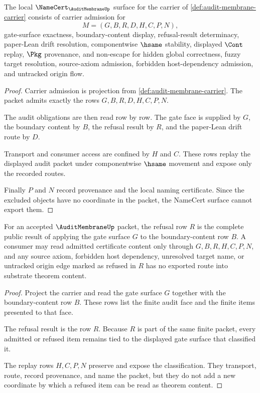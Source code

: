 \begin{theorem}
\label{thm:audit-membrane-namecert-obligations}
The local $\NameCert_{\AuditMembraneUp}$ surface for the carrier of \autoref{def:audit-membrane-carrier} consists of carrier admission for
$$
M=(G,B,R,D,H,C,P,N),
$$
gate-surface exactness, boundary-content display, refusal-result determinacy, paper-Lean drift resolution, componentwise $\hsame$ stability, displayed $\Cont$ replay, $\Pkg$ provenance, and non-escape for hidden global correctness, fuzzy target resolution, source-axiom admission, forbidden host-dependency admission, and untracked origin flow.
\end{theorem}
\begin{proof}
Carrier admission is projection from \autoref{def:audit-membrane-carrier}. The packet admits exactly the rows $G,B,R,D,H,C,P,N$.

The audit obligations are then read row by row. The gate face is supplied by $G$, the boundary content by $B$, the refusal result by $R$, and the paper-Lean drift route by $D$.

Transport and consumer access are confined by $H$ and $C$. These rows replay the displayed audit packet under componentwise $\hsame$ movement and expose only the recorded routes.

Finally $P$ and $N$ record provenance and the local naming certificate. Since the excluded objects have no coordinate in the packet, the NameCert surface cannot export them.
\end{proof}

\begin{theorem}
\label{thm:audit-membrane-boundary-refusal}
For an accepted $\AuditMembraneUp$ packet, the refusal row $R$ is the complete public result of applying the gate surface $G$ to the boundary-content row $B$. A consumer may read admitted certificate content only through $G,B,R,H,C,P,N$, and any source axiom, forbidden host dependency, unresolved target name, or untracked origin edge marked as refused in $R$ has no exported route into substrate theorem content.
\end{theorem}
\begin{proof}
Project the carrier and read the gate surface $G$ together with the boundary-content row $B$. These rows list the finite audit face and the finite items presented to that face.

The refusal result is the row $R$. Because $R$ is part of the same finite packet, every admitted or refused item remains tied to the displayed gate surface that classified it.

The replay rows $H,C,P,N$ preserve and expose the classification. They transport, route, record provenance, and name the packet, but they do not add a new coordinate by which a refused item can be read as theorem content.
\end{proof}

